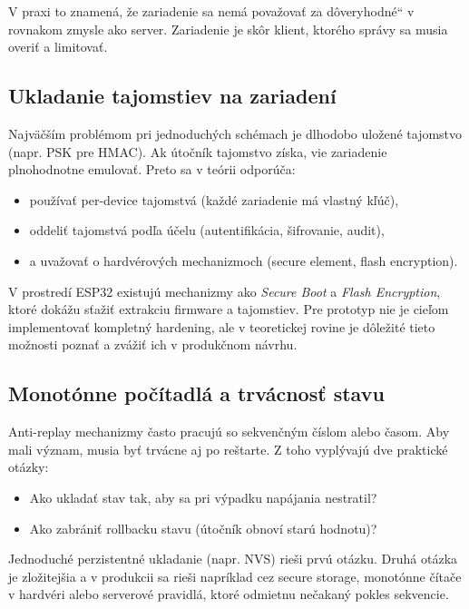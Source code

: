 \documentclass[journal,a4paper,onecolumn]{IEEEtran}
\newcommand{\uv}[1]{\quotedblbase#1\textquotedblleft}
\begin{document}
V praxi to znamená, že zariadenie sa nemá považovať za \uv{dôveryhodné} v rovnakom zmysle ako server. Zariadenie je skôr klient, ktorého správy sa musia overiť a limitovať.

\subsection{Ukladanie tajomstiev na zariadení}

Najväčším problémom pri jednoduchých schémach je dlhodobo uložené tajomstvo (napr. PSK pre HMAC). Ak útočník tajomstvo získa, vie zariadenie plnohodnotne emulovať. Preto sa v teórii odporúča:

\begin{itemize}[leftmargin=*,itemsep=2pt]
  \item používať per-device tajomstvá (každé zariadenie má vlastný kľúč),
  \item oddeliť tajomstvá podľa účelu (autentifikácia, šifrovanie, audit),
  \item a uvažovať o hardvérových mechanizmoch (secure element, flash encryption).
\end{itemize}

V prostredí ESP32 existujú mechanizmy ako \emph{Secure Boot} a \emph{Flash Encryption}, ktoré dokážu sťažiť extrakciu firmware a tajomstiev. Pre prototyp nie je cieľom implementovať kompletný hardening, ale v teoretickej rovine je dôležité tieto možnosti poznať a zvážiť ich v produkčnom návrhu.

\subsection{Monotónne počítadlá a trvácnosť stavu}

Anti-replay mechanizmy často pracujú so sekvenčným číslom alebo časom. Aby mali význam, musia byť trvácne aj po reštarte. Z toho vyplývajú dve praktické otázky:

\begin{itemize}[leftmargin=*,itemsep=2pt]
  \item Ako ukladať stav tak, aby sa pri výpadku napájania nestratil?
  \item Ako zabrániť rollbacku stavu (útočník obnoví starú hodnotu)?
\end{itemize}

Jednoduché perzistentné ukladanie (napr. NVS) rieši prvú otázku. Druhá otázka je zložitejšia a v produkcii sa rieši napríklad cez secure storage, monotónne čítače v hardvéri alebo serverové pravidlá, ktoré odmietnu nečakaný pokles sekvencie.
\end{document}
